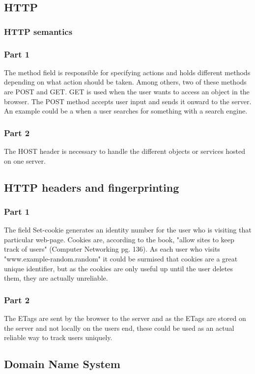 \documentclass[12pt,a4paper]{article}
\begin{document}
\subsection{HTTP}
\subsubsection{HTTP semantics}
\subsubsection*{Part 1}
The method field is responsible for specifying actions and holds different methods depending on what action should be taken. Among others, two of these methods are POST and GET. GET is used when the user wants to access an object in the browser. The POST method accepts user input and sends it onward to the server. An example could be a when a user searches for something with a search engine.

\subsubsection*{Part 2}
The HOST header is necessary to handle the different objects or services hosted on one server. 


\subsection{HTTP headers and fingerprinting}
\subsubsection*{Part 1}
The field Set-cookie generates an identity number for the user who is visiting that particular web-page. Cookies are, according to the book, "allow sites to keep track of users" (Computer Networking pg. 136). As each user who visits "www.example-random.random" it could be surmised that cookies are a great unique identifier, but as the cookies are only useful up until the user deletes them, they are actually unreliable. 

\subsubsection*{Part 2}
The ETags are sent by the browser to the server and as the ETags are stored on the server and not locally on the users end, these could be used as an actual reliable way to track users uniquely.


\subsection{Domain Name System}
\end{document}
